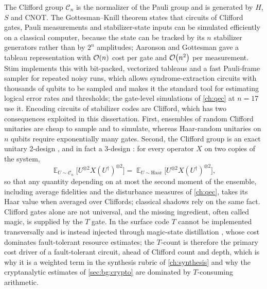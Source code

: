 The Clifford group $\mathcal{C}_n$ is the normalizer of the Pauli group and is generated by $H$, $S$ and CNOT. The Gottesman--Knill theorem states that circuits of Clifford gates, Pauli measurements and stabilizer-state inputs can be simulated efficiently on a classical computer, because the state can be tracked by its $n$ stabilizer generators rather than by $2^n$ amplitudes; Aaronson and Gottesman \cite{aaronson2004stabilizer} gave a tableau representation with $\mathcal{O}\!\left(n\right)$ cost per gate and $\mathcal{O}\!\left(n^2\right)$ per measurement. Stim \cite{gidney2021stim} implements this with bit-packed, vectorized tableaus and a fast Pauli-frame sampler for repeated noisy runs, which allows syndrome-extraction circuits with thousands of qubits to be sampled and makes it the standard tool for estimating logical error rates and thresholds; the gate-level simulations of \cref{ch:qec} at $n=17$ use it. Encoding circuits of stabilizer codes are Clifford, which has two consequences exploited in this dissertation. First, ensembles of random Clifford unitaries are cheap to sample and to simulate, whereas Haar-random unitaries on $n$ qubits require exponentially many gates. Second, the Clifford group is an exact unitary 2-design \cite{dankert2009designs}, and in fact a 3-design \cite{webb2016clifford3design}: for every operator $X$ on two copies of the system,
\begin{equation}\label{eq:bg:design}
\mathop{\mathbb{E}}_{U\sim\mathcal{C}_n}\bigl[U^{\otimes2}X(U^{\dagger})^{\otimes2}\bigr]=\mathop{\mathbb{E}}_{U\sim\mathrm{Haar}}\bigl[U^{\otimes2}X(U^{\dagger})^{\otimes2}\bigr],
\end{equation}
so that any quantity depending on at most the second moment of the ensemble, including average fidelities and the disturbance measures of \cref{ch:qec}, takes its Haar value when averaged over Cliffords; classical shadows \cite{huang2020shadows} rely on the same fact. Clifford gates alone are not universal, and the missing ingredient, often called magic, is supplied by the $T$ gate. In the surface code $T$ cannot be implemented transversally and is instead injected through magic-state distillation \cite{bravyi2005magic}, whose cost dominates fault-tolerant resource estimates; the $T$-count is therefore the primary cost driver of a fault-tolerant circuit, ahead of Clifford count and depth, which is why it is a weighted term in the synthesis rubric of \cref{ch:synthesis} \cite{guo2026rubriq} and why the cryptanalytic estimates of \cref{sec:bg:crypto} are dominated by $T$-consuming arithmetic.

